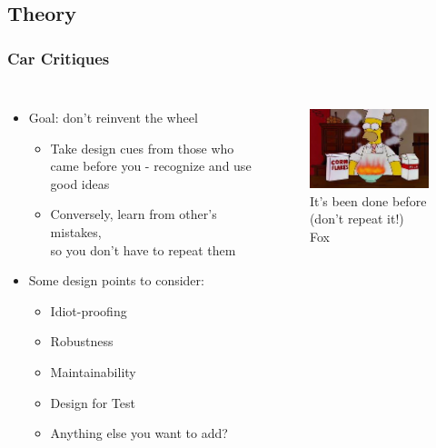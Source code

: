 \documentclass{beamer}
\begin{document}
\subsection{Theory}

\begin{frame}
\frametitle{Car Critiques}
\begin{columns}[t]
\begin{itemize}
  \item Goal: don't reinvent the wheel
  \begin{itemize}
    \item Take design cues from those who came before you - recognize and use good ideas
    \item Conversely, learn from other's mistakes, \\ so you don't have to repeat them
  \end{itemize}
  \item Some design points to consider:
  \begin{itemize}
    \item Idiot-proofing
    \item Robustness
    \item Maintainability
    \item Design for Test
    \item Anything else you want to add?
  \end{itemize}
\end{itemize}

\begin{figure}
  \centering
  \includegraphics[width=1.0\columnwidth]{images-dis2/cereal-fire} \\
  It's been done before \\
  (don't repeat it!) \\
  {\tiny \textcopyright Fox}
\end{figure}
\end{columns}
\end{frame}
\end{document}
